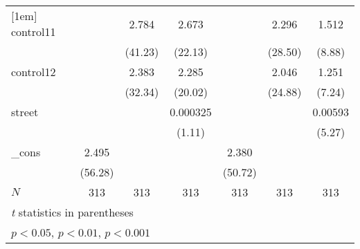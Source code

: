 {\begin{tabular}{l*{6}{c}}
[1em]
control11   &                     &       2.784\sym{***}&       2.673\sym{***}&                     &       2.296\sym{***}&       1.512\sym{***}\\
            &                     &     (41.23)         &     (22.13)         &                     &     (28.50)         &      (8.88)         \\
[1em]
control12   &                     &       2.383\sym{***}&       2.285\sym{***}&                     &       2.046\sym{***}&       1.251\sym{***}\\
            &                     &     (32.34)         &     (20.02)         &                     &     (24.88)         &      (7.24)         \\
[1em]
street      &                     &                     &    0.000325         &                     &                     &     0.00593\sym{***}\\
            &                     &                     &      (1.11)         &                     &                     &      (5.27)         \\
[1em]
\_cons      &       2.495\sym{***}&                     &                     &       2.380\sym{***}&                     &                     \\
            &     (56.28)         &                     &                     &     (50.72)         &                     &                     \\
\hline
\(N\)       &         313         &         313         &         313         &         313         &         313         &         313         \\
\hline\hline
\multicolumn{7}{l}{\footnotesize \textit{t} statistics in parentheses}\\
\multicolumn{7}{l}{\footnotesize \sym{*} \(p<0.05\), \sym{**} \(p<0.01\), \sym{***} \(p<0.001\)}\\
\end{tabular}
}
